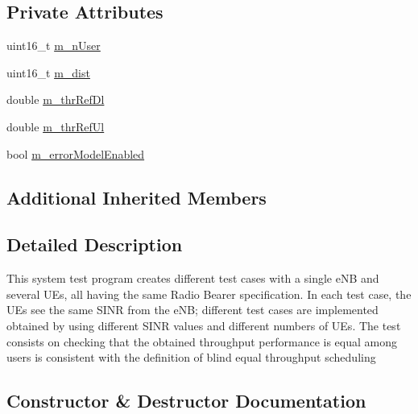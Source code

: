 \subsection*{Private Attributes}
\begin{DoxyCompactItemize}
\item 
uint16\+\_\+t \hyperlink{classLenaTdBetFfMacSchedulerTestCase1_a473de037622baa2f40e541ac9dd1b85c}{m\+\_\+n\+User}
\item 
uint16\+\_\+t \hyperlink{classLenaTdBetFfMacSchedulerTestCase1_a26e6b63863876e36787b091974bbdb9a}{m\+\_\+dist}
\item 
double \hyperlink{classLenaTdBetFfMacSchedulerTestCase1_aa9209c6d7579aee1dc43af183f918d69}{m\+\_\+thr\+Ref\+Dl}
\item 
double \hyperlink{classLenaTdBetFfMacSchedulerTestCase1_a724cc7b548551793c6e071188ea34c88}{m\+\_\+thr\+Ref\+Ul}
\item 
bool \hyperlink{classLenaTdBetFfMacSchedulerTestCase1_a2762c9502708f6f310699f8195d81473}{m\+\_\+error\+Model\+Enabled}
\end{DoxyCompactItemize}
\subsection*{Additional Inherited Members}


\subsection{Detailed Description}
This system test program creates different test cases with a single e\+NB and several U\+Es, all having the same Radio Bearer specification. In each test case, the U\+Es see the same S\+I\+NR from the e\+NB; different test cases are implemented obtained by using different S\+I\+NR values and different numbers of U\+Es. The test consists on checking that the obtained throughput performance is equal among users is consistent with the definition of blind equal throughput scheduling 

\subsection{Constructor \& Destructor Documentation}

